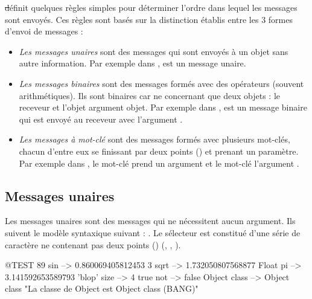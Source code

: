\documentclass[a4paper,10pt,twoside]{book}
\begin{document}
\st d\'efinit quelques r\`egles simples pour d\'eterminer l'ordre dans lequel les messages sont envoy\'es. Ces r\`egles sont bas\'es sur la distinction \'etablis entre les 3 formes d'envoi de messages : 
\begin{itemize}
\item \emph{Les messages unaires} sont des messages qui sont envoy\'es \`a un objet sans autre information. Par exemple dans ,  est un message unaire. 
\item  \emph{Les messages binaires} sont des messages form\'es avec des op\'erateurs (souvent arithm\'etiques). Ils sont binaires car ne concernant que deux objets : le receveur et l'objet argument objet. Par exemple dans , \ct{+} est un message binaire qui est envoy\'e au receveur  avec l'argument . 
\item  \emph{Les messages \`a mot-cl\'e} sont des messages form\'es avec plusieurs mot-cl\'es, chacun d'entre eux se finissant par deux points (\ct{\:}) et prenant un param\`etre.
Par exemple dans , le mot-cl\'e  prend un argument  et le mot-cl\'e  l'argument .
\end{itemize}

\subsection{Messages unaires}
Les messages unaires sont des messages qui ne n\'ecessitent aucun argument. Ils suivent le mod\`ele syntaxique suivant : . Le s\'electeur est constitu\'e d'une s\'erie de caract\`ere ne contenant pas deux points (\ct{\:}) (\eg {}, , ).
\begin{code}{@TEST}
89 sin           --> 0.860069405812453
3 sqrt           --> 1.732050807568877
Float pi         --> 3.141592653589793
'blop' size     --> 4
true not        --> false
Object class --> Object class  "La classe de Object est Object class (BANG)"
\end{code}


\end{document}
